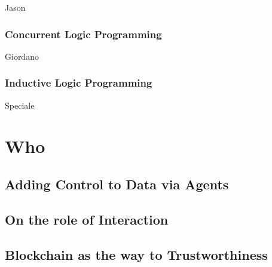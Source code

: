 \documentclass[12pt,a4paper,openright,twoside]{book}
\begin{document}
Jason

\section{Concurrent Logic Programming}

Giordano

\section{Inductive Logic Programming}

Speciale

\part{Who}
\label{part:who}

\cite{imagination-extraamas2021}
\cite{expectation-extraamas2021}

\chapter{Adding Control to Data via Agents}

\chapter{On the role of Interaction}

\cite{tusow-icccn2019}
\cite{respect-idc2017}
\cite{respectx-comsis15}

\chapter{Blockchain as the way to Trustworthiness}

\cite{bctcoord-bct4mas2018wi}
\cite{bctcoord-bct4mas2019}
\cite{bctcoordination-information11}
\cite{blockchain-goodtechs2018}
\cite{proactivesc-blockchain2019}
\cite{blockchainmas-applsci10}



\backmatter

\part*{}



\end{document}
